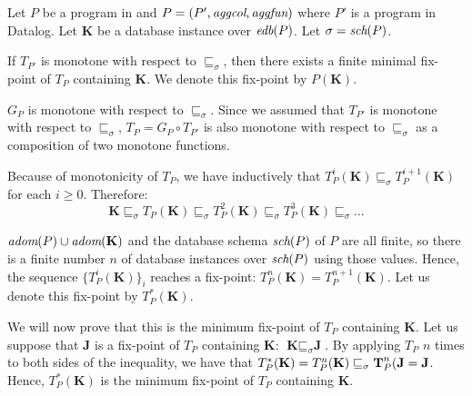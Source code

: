 \begin{thm}
Let $P$ be a program in \datalogra and $P = (P', \textit{aggcol}, \textit{aggfun})$ where $P'$ is a program in Datalog. Let $\textbf{K}$ be a database instance over $\textit{edb}(P)$. Let $\sigma = \textit{sch}(P)$.

If $T_{P'}$ is monotone with respect to $\sqsubseteq_\sigma$, then there exists a finite minimal fix-point of $T_P$ containing $\textbf{K}$. We denote this fix-point by $P(\textbf{K})$.
\end{thm}
\begin{prof}
$G_P$ is monotone with respect to $\sqsubseteq_\sigma$. Since we assumed that $T_{P'}$ is monotone with respect to $\sqsubseteq_\sigma$, $T_P = G_P \circ T_{P'}$ is also monotone with respect to $\sqsubseteq_\sigma$ as a composition of two monotone functions. 

Because of monotonicity of $T_P$, we have inductively that $T_P^i(\textbf{K}) \sqsubseteq_\sigma T_P^{i+1}(\textbf{K})$ for each $i \ge 0$. Therefore:
$$\textbf{K} \sqsubseteq_\sigma T_P(\textbf{K}) \sqsubseteq_\sigma T_P^2(\textbf{K}) \sqsubseteq_\sigma T_P^3(\textbf{K}) \sqsubseteq_\sigma \dots$$

$\textit{adom}(P) \cup \textit{adom}(\textbf{K})$ and the database schema $\textit{sch}(P)$ of $P$ are all finite, so there is a finite number $n$ of database instances over $\textit{sch}(P)$ using those values. Hence, the sequence $\{T_P^i(\textbf{K})\}_i$ reaches a fix-point: $T_P^n(\textbf{K}) = T_P^{n+1}(\textbf{K})$. Let us denote this fix-point by $T_P^*(\textbf{K})$.

We will now prove that this is the minimum fix-point of $T_P$ containing $\textbf{K}$. Let us suppose that $\textbf{J}$ is a fix-point of $T_P$ containing  $\textbf{K}$:  $\textbf{K} \sqsubseteq_\sigma \textbf{J}$. By applying $T_P$ $n$ times to both sides of the inequality, we have that $T_P^*(\textbf{K}) = T_P^n(\textbf{K}) \sqsubseteq_\sigma \textbf T_P^n(\textbf{J} = \textbf{J}$. Hence, $T_P^*(\textbf{K})$ is the minimum fix-point of $T_P$ containing $\textbf{K}$.

\end{prof}

